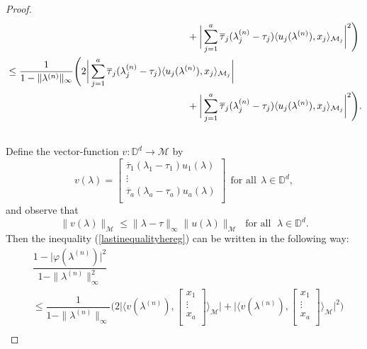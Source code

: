 \documentclass[11pt, reqno]{amsart}
\newcommand\1{\boldsymbol {1}}
\numberwithin{equation}{section}
\begin{document}
\begin{proof}
\begin{align}
&\hspace{6.5cm}+\bigg\lvert \sum_{j=1}^{a}\overline{\tau}_{j}(\lambda^{(n)}_{j}-\tau_{j})\langle u_{j}(\lambda^{(n)}),x_{j}\rangle_{\mathcal{M}_{j}} \bigg\rvert^{2}\Bigg) \nonumber \\       
    &\leq \dfrac{1}{1-\|\lambda^{(n)}\|_{\infty}}\Bigg(2\bigg\lvert\sum_{j=1}^{a}\overline{\tau}_{j}(\lambda^{(n)}_{j}-\tau_{j})\langle u_{j}(\lambda^{(n)}),x_{j}\rangle_{\mathcal{M}_{j}}\bigg\rvert\nonumber\\
    &\hspace{6.5cm}+\bigg\lvert \sum_{j=1}^{a}\overline{\tau}_{j}(\lambda^{(n)}_{j}-\tau_{j})\langle u_{j}(\lambda^{(n)}),x_{j}\rangle_{\mathcal{M}_{j}} \bigg\rvert^{2}\Bigg).\label{lastinequalityhereg}\\\nonumber
\end{align} 
Define the vector-function $v:\mathbb{D}^{d}\rightarrow\mathcal{M}$ by 
\begin{equation*}
v(\lambda)=\begin{bmatrix}
	\overline{\tau}_{1}(\lambda_{1}-\tau_{1})u_{1}(\lambda) \\
    \vdots \\
    \overline{\tau}_{a}(\lambda_{a}-\tau_{a})u_{a}(\lambda)  \\
\end{bmatrix}~~\text{for all}~~\lambda\in\mathbb{D}^{d},
\end{equation*}
and observe that 
$$    \| v(\lambda)\|_{\mathcal{M}} \leq \| \lambda - \tau \|_\infty  \| u(\lambda)\|_{\mathcal{M}} \; \text{ for all } \; \lambda \in \mathbb{D}^{d}.$$ 
Then the inequality (\ref{lastinequalityhereg}) can be written in the following way:
\begin{align*}
    &\dfrac{1-\lvert \varphi(\lambda^{(n)})\rvert^{2}}{1-\|\lambda^{(n)}\|_{\infty}^{2}}\\
    &\leq\dfrac{1}{1-\|\lambda^{(n)}\|_{\infty}}\Bigg(2\Bigg\lvert\Bigg\langle v(\lambda^{(n)}),\begin{bmatrix}
	x_{1} \\
    \vdots \\
    x_{a}  \\
\end{bmatrix}\Bigg\rangle_{\mathcal{M}}\Bigg\rvert+\Bigg\lvert\Bigg\langle v(\lambda^{(n)}),\begin{bmatrix}
	x_{1} \\
    \vdots \\
    x_{a}  \\
\end{bmatrix}\Bigg\rangle_{\mathcal{M}}\Bigg\rvert^{2}\Bigg)\\

\end{align*}
\end{proof}
\end{document}
